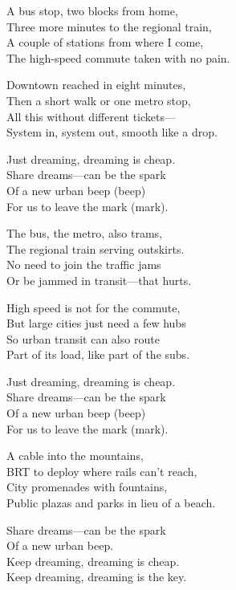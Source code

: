 \begin{lyrics}
A bus stop, two blocks from home,\\
Three more minutes to the regional train,\\
A couple of stations from where I come,\\
The high-speed commute taken with no pain.

Downtown reached in eight minutes,\\
Then a short walk or one metro stop,\\
All this without different tickets—\\
System in, system out, smooth like a drop.

Just dreaming, dreaming is cheap.\\
Share dreams—can be the spark\\
Of a new urban beep (beep)\\
For us to leave the mark (mark).

The bus, the metro, also trams,\\
The regional train serving outskirts.\\
No need to join the traffic jams\\
Or be jammed in transit—that hurts.

High speed is not for the commute,\\
But large cities just need a few hubs\\
So urban transit can also route\\
Part of its load, like part of the subs.

Just dreaming, dreaming is cheap.\\
Share dreams—can be the spark\\
Of a new urban beep (beep)\\
For us to leave the mark (mark).

A cable into the mountains,\\
BRT to deploy where rails can’t reach,\\
City promenades with fountains,\\
Public plazas and parks in lieu of a beach.

Share dreams—can be the spark\\
Of a new urban beep.\\
Keep dreaming, dreaming is cheap.\\
Keep dreaming, dreaming is the key.
\end{lyrics}

